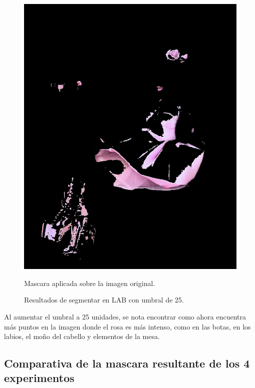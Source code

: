 \documentclass[11pt, letterpaper]{article}
\begin{document}
\begin{figure}[h!]
\begin{minipage}{0.4\textwidth}
		\includegraphics[width=\textwidth]{IMG/R43.jpg}
		\caption*{Mascara aplicada sobre la imagen original.}
	\end{minipage}
	\caption{Resultados de segmentar en LAB con umbral de 25.}
	\label{fig:f5}
\end{figure}

Al aumentar el umbral a 25 unidades, se nota encontrar como ahora encuentra más puntos en la imagen donde el rosa es más intenso, como en las botas, en los labios, el moño del cabello y elementos de la mesa.

\newpage

\subsection{Comparativa de la mascara resultante de los 4 experimentos}
\end{document}
